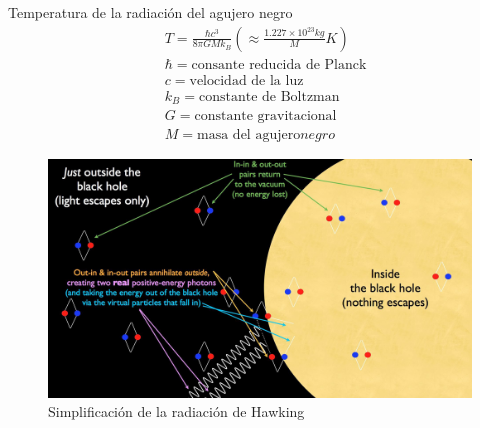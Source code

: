 \documentclass{beamer}
\begin{document}
\begin{frame}{Temperatura de la radiación del agujero negro}
    \begin{equation*}
    \begin{split}
        & T=\frac{\hbar c^3}{8 \pi GMk_B} \left( \approx \frac{1.227\times 10^{23}kg}{M}K\right) \\
        & \hbar = \text{consante reducida de Planck} \\
        & c = \text{velocidad de la luz} \\
        & k_B = \text{constante de Boltzman} \\
        & G = \text{constante gravitacional} \\
        & M = \text{masa del agujero} negro 
    \end{split}
\end{equation*}
\end{frame}
\begin{frame}{}
    \begin{figure}[h]
        \centering
        \includegraphics[scale = 0.17]{Rashos.jpeg}
        \caption{Simplificación de la radiación de Hawking}
        \label{fig:Rasho}
    \end{figure}
\end{frame}
\end{document}
